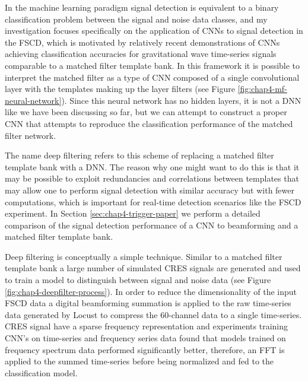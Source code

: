 In the machine learning paradigm signal detection is equivalent to a binary classification problem between the signal and noise data classes, and my investigation focuses specifically on the application of CNNs to signal detection in the FSCD, which is motivated by relatively recent demonstrations of CNNs achieving classification accuracies for gravitational wave time-series signals comparable to a matched filter template bank. In this framework it is possible to interpret the matched filter as a type of CNN composed of a single convolutional layer with the templates making up the layer filters (see Figure \ref{fig:chap4-mf-neural-network}). Since this neural network has no hidden layers, it is not a DNN like we have been discussing so far, but we can attempt to construct a proper CNN that attempts to reproduce the classification performance of the matched filter network.

The name deep filtering refers to this scheme of replacing a matched filter template bank with a DNN. The reason why one might want to do this is that it may be possible to exploit redundancies and correlations between templates that may allow one to perform signal detection with similar accuracy but with fewer computations, which is important for real-time detection scenarios like the FSCD experiment. In Section \ref{sec:chap4-trigger-paper} we perform a detailed comparison of the signal detection performance of a CNN to beamforming and a matched filter template bank.

Deep filtering is conceptually a simple technique. Similar to a matched filter template bank a large number of simulated CRES signals are generated and used to train a model to distinguish between signal and noise data (see Figure \ref{fig:chap4-deepfilter-process}). In order to reduce the dimensionality of the input FSCD data a digital beamforming summation is applied to the raw time-series data generated by Locust to compress the 60-channel data to a single time-series. CRES signal have a sparse frequency representation and experiments training CNN's on time-series and frequency series data found that models trained on frequency spectrum data performed significantly better, therefore, an FFT is applied to the summed time-series before being normalized and fed to the classification model.


